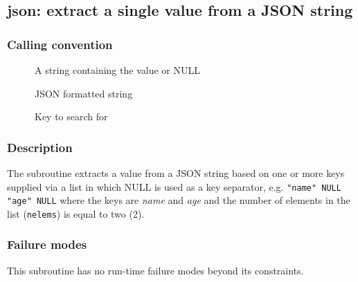 \clearpage
{}
{}
\label{subr:json}
\subsection*{json: extract a single value from a JSON string}

\subsubsection*{Calling convention}

\begin{description}
\item[] A string containing the value or NULL
\item[] JSON formatted string
\item[] Key to search for
\end{description}

\subsubsection*{Description}

The  subroutine extracts a value from a JSON string
based on one or more keys supplied via a list in which NULL is used as
a key separator, e.g. \verb|"name" NULL "age" NULL| where the keys are
\emph{name} and \emph{age} and the number of elements in the list
(\verb|nelems|) is equal to two (2).

\subsubsection*{Failure modes}

This subroutine has no run-time failure modes beyond its constraints.
